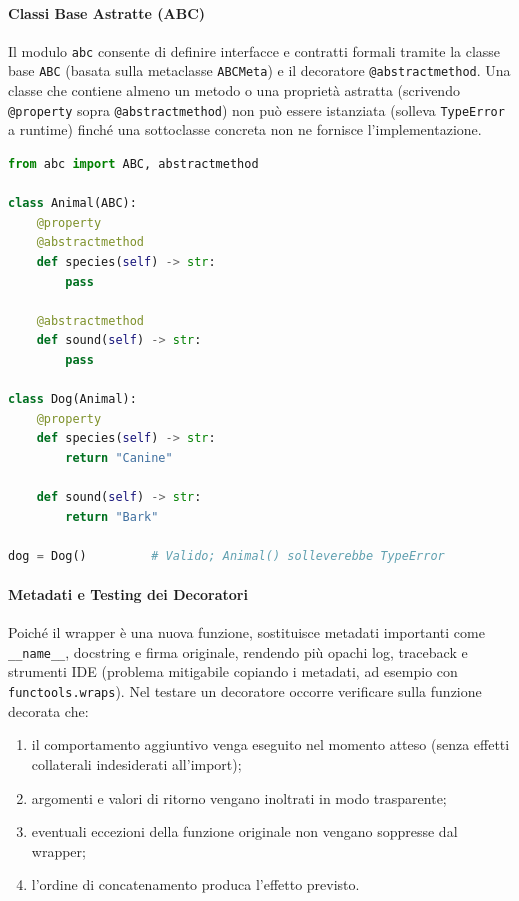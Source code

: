 \documentclass[12pt]{extarticle}
\begin{document}
\paragraph{Classi Base Astratte (ABC)}
Il modulo \texttt{abc} consente di definire interfacce e contratti formali tramite la classe base \texttt{ABC} (basata sulla metaclasse \texttt{ABCMeta}) e il decoratore \texttt{@abstractmethod}. Una classe che contiene almeno un metodo o una proprietà astratta (scrivendo \texttt{@property} sopra \texttt{@abstractmethod}) non può essere istanziata (solleva \texttt{TypeError} a runtime) finché una sottoclasse concreta non ne fornisce l'implementazione.

\begin{lstlisting}[language=Python]
from abc import ABC, abstractmethod

class Animal(ABC):
    @property
    @abstractmethod
    def species(self) -> str:
        pass

    @abstractmethod
    def sound(self) -> str:
        pass

class Dog(Animal):
    @property
    def species(self) -> str:
        return "Canine"

    def sound(self) -> str:
        return "Bark"

dog = Dog()         # Valido; Animal() solleverebbe TypeError
\end{lstlisting}

\paragraph{Metadati e Testing dei Decoratori}
Poiché il wrapper è una nuova funzione, sostituisce metadati importanti come \texttt{\_\_name\_\_}, docstring e firma originale, rendendo più opachi log, traceback e strumenti IDE (problema mitigabile copiando i metadati, ad esempio con \texttt{functools.wraps}). Nel testare un decoratore occorre verificare sulla funzione decorata che:
\begin{enumerate}
\item il comportamento aggiuntivo venga eseguito nel momento atteso (senza effetti collaterali indesiderati all'import);
\item argomenti e valori di ritorno vengano inoltrati in modo trasparente;
\item eventuali eccezioni della funzione originale non vengano soppresse dal wrapper;
\item l'ordine di concatenamento produca l'effetto previsto.
\end{enumerate}
\end{document}
